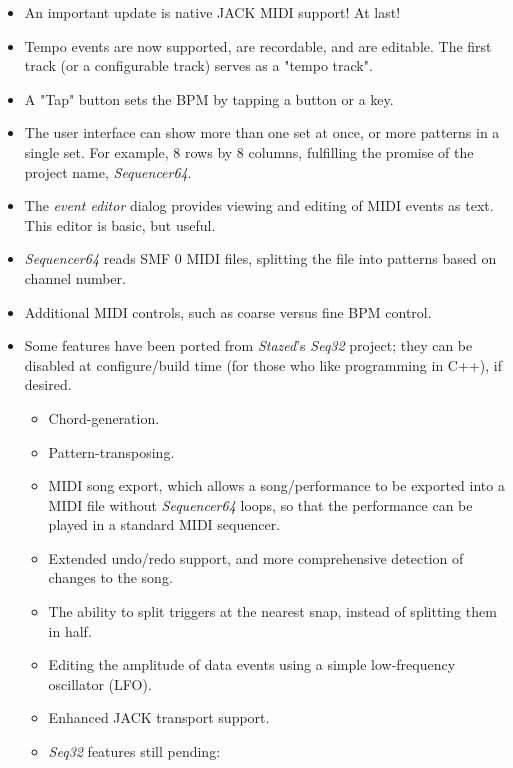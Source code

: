 \documentclass[
 11pt,
 twoside,
 a4paper,
 headinclude,
 footinclude,
 final                                 %
]{article}
\begin{document}
   \begin{itemize}
      \item An important update is native JACK MIDI support!  At last!
      \item Tempo events are now supported, are recordable, and are editable.
         The first track (or a configurable track) serves as a "tempo track".
      \item A "Tap" button sets the BPM by tapping a button or a key.
      \item The user interface can show more than one set at once, or
         more patterns in a single set.  For example, 8 rows by 8 columns,
         fulfilling the promise of the project name, \textsl{Sequencer64}.
      \item The \textsl{event editor} dialog
         provides viewing and editing of MIDI events as text.
         This editor is basic, but useful.
      \item \textsl{Sequencer64} reads SMF 0 MIDI files, splitting
         the file into patterns based on channel number.
      \item Additional MIDI controls, such as coarse versus fine BPM control.
      \item Some features have been ported from \textsl{Stazed}'s
         \textsl{Seq32} \cite{seq32} project; they can be disabled at
         configure/build time (for those who like programming in C++),
         if desired.
         \begin{itemize}
            \item Chord-generation.
            \item Pattern-transposing.
            \item MIDI song export, which
               allows a song/performance to be exported into a MIDI file
               without \textsl{Sequencer64} loops, so that the performance can
               be played in a standard MIDI sequencer.
            \item Extended undo/redo support, and more comprehensive detection
               of changes to the song.
            \item The ability to split triggers at the nearest snap, instead
               of splitting them in half.
            \item Editing the amplitude of data events using a simple
               low-frequency oscillator (LFO).
            \item Enhanced JACK transport support.
            \item \textsl{Seq32} features still pending:

\end{itemize}
\end{itemize}
\end{document}
